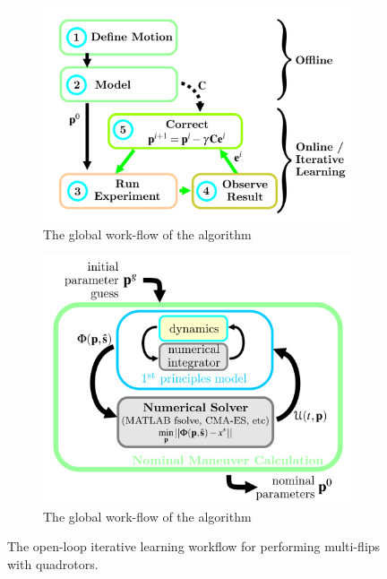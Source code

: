 \documentclass{thesisreport}
\begin{document}
\begin{figure}[h]
     \centering
     \begin{subfigure}[b]{0.45\textwidth}
         \centering
         \includegraphics[width=\textwidth]{Images/Flip/Open_Loop_iterative_learning_a}
         \caption{The global work-flow of the algorithm}
         \label{fig:Open_Loop_a}
     \end{subfigure}
     \hfill
     \begin{subfigure}[b]{0.45\textwidth}
         \centering
         \includegraphics[width=\textwidth]{Images/Flip/Open_Loop_iterative_learning_b}
         \caption{The global work-flow of the algorithm}
         \label{fig:Open_Loop_b}
     \end{subfigure}
        \caption{The open-loop iterative learning workflow for performing multi-flips with quadrotors\cite{Lupashin2012}.}
        \label{Open_Loop_iterative_Learning}
\end{figure}
\end{document}
